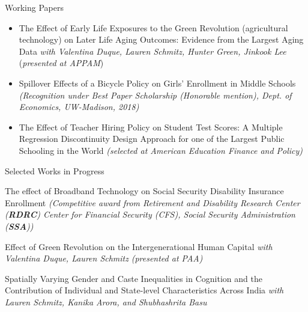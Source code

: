 \documentclass{resume} %
\begin{document}
\begin{rSection}{Working Papers}
\begin{itemize}
\item The Effect of Early Life Exposures to the Green Revolution (agricultural technology) on Later Life Aging Outcomes: Evidence from the Largest Aging Data \textit{with Valentina Duque, Lauren Schmitz, Hunter Green, Jinkook Lee} (\textit{\scriptsize{presented at APPAM}}) 

\item Spillover Effects of a Bicycle Policy on Girls' Enrollment in Middle Schools \textit{\scriptsize{(Recognition under Best Paper Scholarship (Honorable mention), Dept. of Economics, UW-Madison, 2018) }}

\item The Effect of Teacher Hiring Policy on Student Test Scores: A Multiple Regression Discontinuity Design Approach for one of the Largest Public Schooling in the World \textit{\scriptsize{(selected at American Education Finance and Policy)}}

\end{itemize}








\end{rSection}


\begin{rSection}{Selected Works in Progress}


\item The effect of Broadband Technology on Social Security Disability Insurance Enrollment \textit{\scriptsize{(Competitive award from Retirement and Disability Research Center (\textbf{RDRC}) Center for Financial Security (CFS), Social Security Administration (\textbf{SSA}))}}

\item Effect of Green Revolution on the Intergenerational Human Capital \textit{with Valentina Duque, Lauren Schmitz} \textit{\scriptsize{(presented at PAA})}

\item Spatially Varying Gender and Caste Inequalities in Cognition and the Contribution of Individual and State-level Characteristics Across India \textit{with Lauren Schmitz, Kanika Arora, and Shubhashrita Basu}


\end{rSection}
\end{document}
